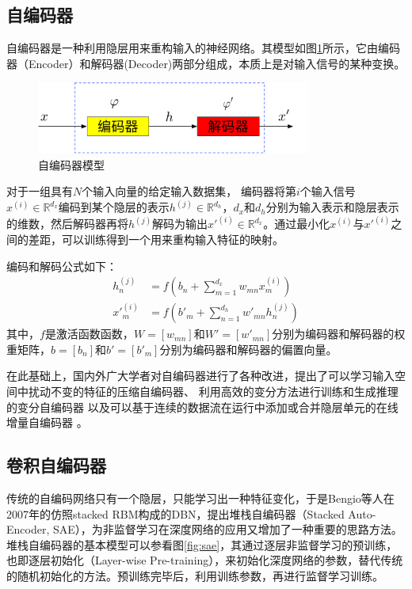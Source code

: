 \subsection{自编码器}

自编码器是一种利用隐层用来重构输入的神经网络。其模型如图\ref{fig:ae}所示，它由编码器（Encoder）和解码器(Decoder)两部分组成，本质上是对输入信号的某种变换。
\begin{figure}[hbt]
	\centering
	\includegraphics[width=9cm]{figures/AE/ae}
	\caption{自编码器模型}
	\label{fig:ae}
\end{figure}
对于一组具有$N$个输入向量的给定输入数据集，
编码器将第$i$个输入信号$x^{(i)}\in\mathbb{R}^{d_x}$编码到某个隐层的表示$h^{(j)}\in\mathbb{R}^{d_h}$，$d_x$和$d_h$分别为输入表示和隐层表示的维数，然后解码器再将$h^{(j)}$解码为输出$x'^{(i)}\in\mathbb{R}^{d_x}$。通过最小化$x^{(i)}$与$x'^{(i)}$之间的差距，可以训练得到一个用来重构输入特征的映射。

编码和解码公式如下：
\begin{align}
	h^{(j)}_n &= f(b_n+\sum_{m=1}^{d_x}w_{mn}x^{(i)}_m) \\
	x'^{(i)}_m &= f(b'_m+\sum_{n=1}^{d_h}w'_{mn}h^{(j)}_n)
\end{align}
其中，$f$是激活函数函数，${W}=[w_{mn}]$和${W}'=[w'_{mn}]$分别为编码器和解码器的权重矩阵，${b}=[b_n]$和${b'}=[b'_m]$分别为编码器和解码器的偏置向量。

在此基础上，国内外广大学者对自编码器进行了各种改进，提出了可以学习输入空间中扰动不变的特征的压缩自编码器\cite{rifai2011contractive}、
利用高效的变分方法进行训练和生成推理的变分自编码器\cite{kingma2013auto}
以及可以基于连续的数据流在运行中添加或合并隐层单元的在线增量自编码器 \cite{zhou2012online}。

\subsection{卷积自编码器}
传统的自编码网络只有一个隐层，只能学习出一种特征变化，于是Bengio\cite{bengio2007greedy}等人在2007年的仿照stacked RBM构成的DBN，提出堆栈自编码器（Stacked Auto-Encoder, SAE），为非监督学习在深度网络的应用又增加了一种重要的思路方法。
堆栈自编码器的基本模型可以参看图\ref{fig:sae}，其通过逐层非监督学习的预训练，也即逐层初始化（Layer-wise Pre-training），来初始化深度网络的参数，替代传统的随机初始化的方法。预训练完毕后，利用训练参数，再进行监督学习训练。

